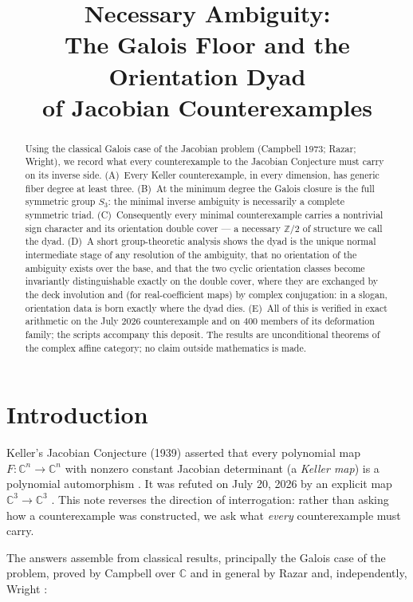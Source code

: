 \documentclass[11pt,reqno]{amsart}
\title[Necessary ambiguity: the Galois floor and the orientation dyad]
{Necessary Ambiguity:\\ The Galois Floor and the Orientation Dyad\\ of Jacobian Counterexamples}
\author{\AuthorName}
\date{\PreprintDate}
\numberwithin{equation}{section}
\theoremstyle{remark}
\newcommand{\C}{\mathbb C}
\newcommand{\Z}{\mathbb Z}
\begin{document}
\begin{abstract}
Using the classical Galois case of the Jacobian problem (Campbell 1973;
Razar; Wright), we record what every counterexample to the Jacobian
Conjecture must carry on its inverse side. (A)~Every Keller counterexample,
in every dimension, has generic fiber degree at least three. (B)~At the
minimum degree the Galois closure is the full symmetric group $S_3$: the
minimal inverse ambiguity is necessarily a complete symmetric triad.
(C)~Consequently every minimal counterexample carries a nontrivial sign
character and its orientation double cover --- a necessary $\Z/2$ of
structure we call the dyad. (D)~A short group-theoretic analysis shows the
dyad is the unique normal intermediate stage of any resolution of the
ambiguity, that no orientation of the ambiguity exists over the base, and
that the two cyclic orientation classes become invariantly distinguishable
exactly on the double cover, where they are exchanged by the deck
involution and (for real-coefficient maps) by complex conjugation: in a
slogan, orientation data is born exactly where the dyad dies. (E)~All of
this is verified in exact arithmetic on the July 2026 counterexample and on
$400$ members of its deformation family; the scripts accompany this
deposit. The results are unconditional theorems of the complex affine
category; no claim outside mathematics is made.
\end{abstract}

\maketitle

\section{Introduction}\label{sec:intro}

Keller's Jacobian Conjecture (1939) asserted that every polynomial map
$F\colon\C^n\to\C^n$ with nonzero constant Jacobian determinant (a
\emph{Keller map}) is a polynomial automorphism \cite{Keller,vdE}. It was
refuted on July 20, 2026 by an explicit map $\C^3\to\C^3$
\cite{Alpoge,Counterexample2026}. This note reverses the direction of
interrogation: rather than asking how a counterexample was constructed, we
ask what \emph{every} counterexample must carry.

The answers assemble from classical results, principally the Galois case of
the problem, proved by Campbell \cite{Campbell} over $\C$ and in general by
Razar \cite{Razar} and, independently, Wright \cite{Wright}:
\end{document}

